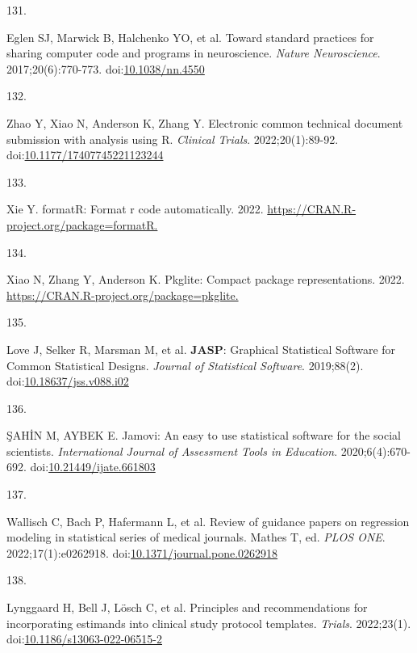 \documentclass[
]{book}
\newlength{\cslhangindent}
\newlength{\csllabelwidth}
\newlength{\cslentryspacingunit} %
\newenvironment{CSLReferences}[2] %
 {%
  \setlength{\parindent}{0pt}
  \ifodd #1
  \let\oldpar\par
  \def\par{\hangindent=\cslhangindent\oldpar}
  \fi
  \setlength{\parskip}{#2\cslentryspacingunit}
 }%
 {}
\newcommand{\CSLLeftMargin}[1]{\parbox[t]{\csllabelwidth}{#1}}
\newcommand{\CSLRightInline}[1]{\parbox[t]{\linewidth - \csllabelwidth}{#1}\break}
\begin{document}
\begin{CSLReferences}{0}{0}
\leavevmode{}%
\CSLLeftMargin{131. }%
\CSLRightInline{Eglen SJ, Marwick B, Halchenko YO, et al. Toward standard practices for sharing computer code and programs in neuroscience. \emph{Nature Neuroscience}. 2017;20(6):770-773. doi:\href{https://doi.org/10.1038/nn.4550}{10.1038/nn.4550}}

\leavevmode{}%
\CSLLeftMargin{132. }%
\CSLRightInline{Zhao Y, Xiao N, Anderson K, Zhang Y. Electronic common technical document submission with analysis using R. \emph{Clinical Trials}. 2022;20(1):89-92. doi:\href{https://doi.org/10.1177/17407745221123244}{10.1177/17407745221123244}}

\leavevmode{}%
\CSLLeftMargin{133. }%
\CSLRightInline{Xie Y. formatR: Format r code automatically. 2022. \href{https://CRAN.R-project.org/package=formatR}{https://CRAN.R-project.org/package=formatR.}}

\leavevmode{}%
\CSLLeftMargin{134. }%
\CSLRightInline{Xiao N, Zhang Y, Anderson K. Pkglite: Compact package representations. 2022. \href{https://CRAN.R-project.org/package=pkglite}{https://CRAN.R-project.org/package=pkglite.}}

\leavevmode{}%
\CSLLeftMargin{135. }%
\CSLRightInline{Love J, Selker R, Marsman M, et al. {\textbf{JASP}}: Graphical Statistical Software for Common Statistical Designs. \emph{Journal of Statistical Software}. 2019;88(2). doi:\href{https://doi.org/10.18637/jss.v088.i02}{10.18637/jss.v088.i02}}

\leavevmode{}%
\CSLLeftMargin{136. }%
\CSLRightInline{ŞAHİN M, AYBEK E. Jamovi: An easy to use statistical software for the social scientists. \emph{International Journal of Assessment Tools in Education}. 2020;6(4):670-692. doi:\href{https://doi.org/10.21449/ijate.661803}{10.21449/ijate.661803}}

\leavevmode{}%
\CSLLeftMargin{137. }%
\CSLRightInline{Wallisch C, Bach P, Hafermann L, et al. Review of guidance papers on regression modeling in statistical series of medical journals. Mathes T, ed. \emph{PLOS ONE}. 2022;17(1):e0262918. doi:\href{https://doi.org/10.1371/journal.pone.0262918}{10.1371/journal.pone.0262918}}

\leavevmode{}%
\CSLLeftMargin{138. }%
\CSLRightInline{Lynggaard H, Bell J, Lösch C, et al. Principles and recommendations for incorporating estimands into clinical study protocol templates. \emph{Trials}. 2022;23(1). doi:\href{https://doi.org/10.1186/s13063-022-06515-2}{10.1186/s13063-022-06515-2}}


\end{CSLReferences}
\end{document}
